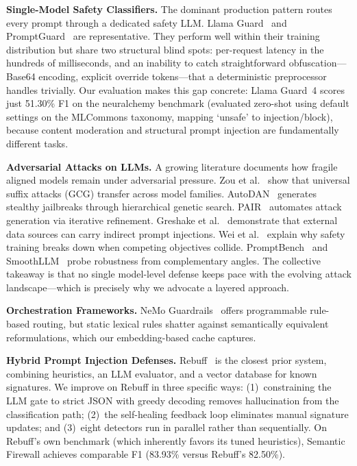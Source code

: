 \documentclass[conference]{IEEEtran}
\begin{document}
\textbf{Single-Model Safety Classifiers.}
The dominant production pattern routes every prompt through a
dedicated safety LLM. Llama Guard~\cite{llamaguard} and
PromptGuard~\cite{promptguard} are representative. They perform
well within their training distribution but share two structural
blind spots: per-request latency in the hundreds of milliseconds,
and an inability to catch straightforward obfuscation---Base64
encoding, explicit override tokens---that a deterministic
preprocessor handles trivially. Our evaluation makes this gap
concrete: Llama Guard~4 scores just 51.30\% F1 on the neuralchemy
benchmark (evaluated zero-shot using default settings on the
MLCommons taxonomy, mapping `unsafe' to injection/block), because
content moderation and structural prompt injection are fundamentally
different tasks.

\textbf{Adversarial Attacks on LLMs.}
A growing literature documents how fragile aligned models remain
under adversarial pressure. Zou et al.~\cite{zou2023universal}
show that universal suffix attacks (GCG) transfer across model
families. AutoDAN~\cite{autodan} generates stealthy jailbreaks
through hierarchical genetic search. PAIR~\cite{pair} automates
attack generation via iterative refinement. Greshake et
al.~\cite{greshake2023indirect} demonstrate that external data
sources can carry indirect prompt injections. Wei et
al.~\cite{wei2023jailbroken} explain why safety training breaks
down when competing objectives collide. PromptBench~\cite{promptbench}
and SmoothLLM~\cite{smoothllm} probe robustness from complementary
angles. The collective takeaway is that no single model-level
defense keeps pace with the evolving attack landscape---which is
precisely why we advocate a layered approach.

\textbf{Orchestration Frameworks.}
NeMo Guardrails~\cite{nemoguardrails} offers programmable rule-based
routing, but static lexical rules shatter against semantically
equivalent reformulations, which our embedding-based cache captures.

\textbf{Hybrid Prompt Injection Defenses.}
Rebuff~\cite{rebuff} is the closest prior system, combining
heuristics, an LLM evaluator, and a vector database for known
signatures. We improve on Rebuff in three specific ways:
(1)~constraining the LLM gate to strict JSON with greedy decoding
removes hallucination from the classification path;
(2)~the self-healing feedback loop eliminates manual signature
updates; and (3)~eight detectors run in parallel rather than
sequentially. On Rebuff's own benchmark (which inherently favors
its tuned heuristics), Semantic Firewall achieves comparable F1
(83.93\% versus Rebuff's 82.50\%).
\end{document}
